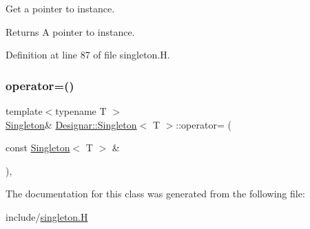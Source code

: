 Get a pointer to instance.

\begin{DoxyReturn}{Returns}
A pointer to instance. 
\end{DoxyReturn}


Definition at line 87 of file singleton.\+H.

\mbox{\label{class_designar_1_1_singleton_a8968c625d740c01211ec483142e52a58}} 
\subsubsection{\texorpdfstring{operator=()}{operator=()}}
{\footnotesize\ttfamily template$<$typename T $>$ \\
\hyperlink{class_designar_1_1_singleton}{Singleton}\& \hyperlink{class_designar_1_1_singleton}{Designar\+::\+Singleton}$<$ T $>$\+::operator= (\begin{DoxyParamCaption}\item[{const \hyperlink{class_designar_1_1_singleton}{Singleton}$<$ T $>$ \&}]{ }\end{DoxyParamCaption})\hspace{0.3cm}{\ttfamily [protected]}, {\ttfamily [delete]}}



The documentation for this class was generated from the following file\+:\begin{DoxyCompactItemize}
\item 
include/\hyperlink{singleton_8_h}{singleton.\+H}\end{DoxyCompactItemize}
